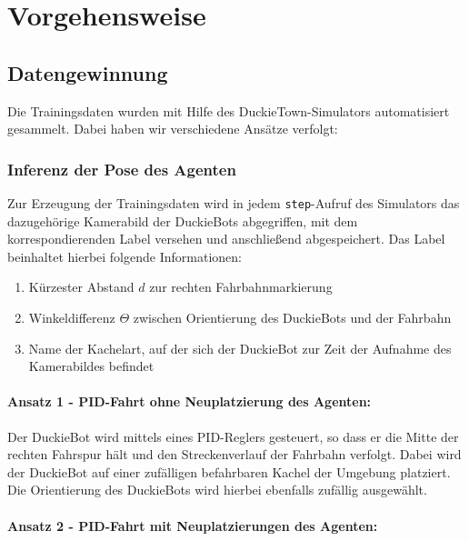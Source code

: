 
\chapter{Vorgehensweise}

\section{Datengewinnung}

Die Trainingsdaten wurden mit Hilfe des DuckieTown-Simulators automatisiert gesammelt. Dabei haben wir verschiedene Ansätze verfolgt:

\subsection{Inferenz der Pose des Agenten}

Zur Erzeugung der Trainingsdaten wird in jedem \texttt{step}-Aufruf des Simulators das dazugehörige Kamerabild der DuckieBots abgegriffen, mit dem korrespondierenden Label versehen und anschließend abgespeichert. Das Label beinhaltet hierbei folgende Informationen:

\begin{enumerate}
	\item Kürzester Abstand $d$ zur rechten Fahrbahnmarkierung
	\item Winkeldifferenz $\Theta$ zwischen Orientierung des DuckieBots und der Fahrbahn
	\item Name der Kachelart, auf der sich der DuckieBot zur Zeit der Aufnahme des Kamerabildes befindet
\end{enumerate}

\subsubsection{Ansatz 1 - PID-Fahrt ohne Neuplatzierung des Agenten:}

Der DuckieBot wird mittels eines PID-Reglers gesteuert, so dass er die Mitte der rechten Fahrspur hält und den Streckenverlauf der Fahrbahn verfolgt. Dabei wird der DuckieBot auf einer zufälligen befahrbaren Kachel der Umgebung platziert. Die Orientierung des DuckieBots  wird hierbei ebenfalls zufällig ausgewählt.

\subsubsection{Ansatz 2 - PID-Fahrt mit Neuplatzierungen des Agenten:}

